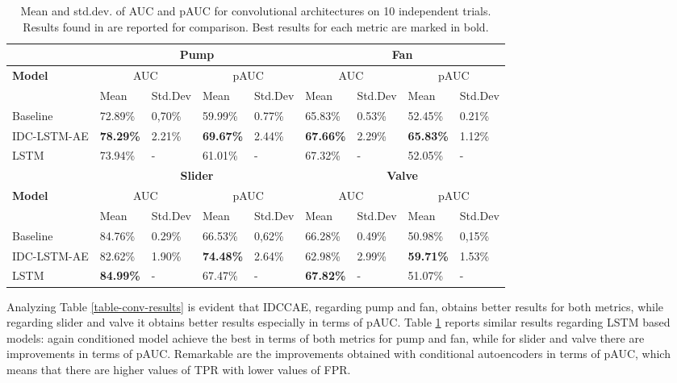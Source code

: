 \begin{table}[ht]
\small
\centering
\begin{tabular}{|m{2.8cm}|m{1.2cm}|m{1.25cm}|m{1.2cm}|m{1.25cm}|m{1.2cm}|m{1.25cm}|m{1.2cm}|m{1.25cm}|} 
\cline{2-9}
\multicolumn{1}{c|}{} & \multicolumn{4}{c|}{\textbf{Pump}} & \multicolumn{4}{c|}{\textbf{Fan}} \\ 
\hline
\multirow{2}{*}{\textbf{Model}} & \multicolumn{2}{c|}{AUC} & \multicolumn{2}{c|}{pAUC} & \multicolumn{2}{c|}{AUC} & \multicolumn{2}{c|}{pAUC} \\ 
\cline{2-9}
 & Mean & Std.Dev & Mean & Std.Dev & Mean & Std.Dev & Mean & Std.Dev \\ 
\hline
Baseline & 72.89\% & 0,70\%~ & 59.99\% & 0.77\% & 65.83\% & 0.53\% & 52.45\% & 0.21\% \\ 
\hline
IDC-LSTM-AE & \textbf{78.29\%} & 2.21\% & \textbf{69.67\%} & 2.44\% & \textbf{67.66\%} & 2.29\% & \textbf{65.83\%} & 1.12\% \\ 
\hline
LSTM \cite{16LSTMDeepAutoencodersForASDtask} & 73.94\% & - & 61.01\% & - & 67.32\% & - & 52.05\% & - \\ 
\hline
\multicolumn{1}{c|}{} & \multicolumn{4}{c|}{\textbf{Slider}} & \multicolumn{4}{c|}{\textbf{Valve}} \\ 
\hline
\multirow{2}{*}{\textbf{Model}} & \multicolumn{2}{c|}{AUC} & \multicolumn{2}{c|}{pAUC} & \multicolumn{2}{c|}{AUC} & \multicolumn{2}{c|}{pAUC} \\ 
\cline{2-9}
 & Mean & Std.Dev & Mean & Std.Dev & Mean & Std.Dev & Mean & Std.Dev \\ 
\hline
Baseline & 84.76\% & 0.29\% & 66.53\% & 0,62\%~ & 66.28\% & 0.49\% & 50.98\% & 0,15\%~ \\ 
\hline
IDC-LSTM-AE & 82.62\% & 1.90\% & \textbf{74.48\%} & 2.64\% & 62.98\% & 2.99\% & \textbf{59.71\%} & 1.53\% \\ 
\hline
LSTM \cite{16LSTMDeepAutoencodersForASDtask} & \textbf{84.99\%} & - & 67.47\% & - & \textbf{67.82\%} & - & 51.07\% & - \\
\hline
\end{tabular}
\caption{Mean and std.dev. of AUC and pAUC for convolutional architectures on 10 independent trials. Results found in \cite{16LSTMDeepAutoencodersForASDtask} are reported for comparison. Best results for each metric are marked in bold. }
\label{table-lstm-results}
\end{table}

Analyzing Table \ref{table-conv-results} is evident that IDCCAE, regarding pump and fan,  obtains better results for both metrics, while regarding slider and valve it obtains better results especially in terms of pAUC. Table \ref{table-lstm-results} reports similar results regarding LSTM based models: again conditioned model achieve the best in terms of both metrics for pump and fan, while for slider and valve there are improvements in terms of pAUC. Remarkable are the improvements obtained with conditional autoencoders in terms of pAUC, which means that there are higher values of TPR with lower values of FPR.

